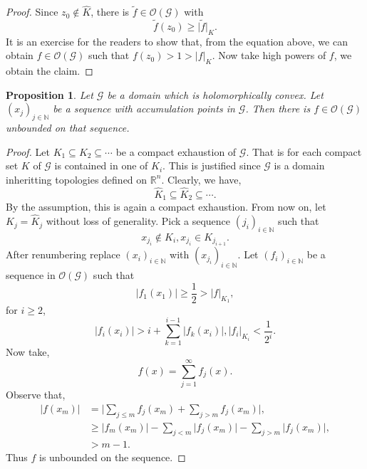 \documentclass{article}
\newtheorem{proposition}{Proposition}[section]
\newcommand{\N}[0]{\mathbb{N}}
\newcommand{\R}[0]{\mathbb{R}}
\newcommand{\G}[0]{\mathcal{G}}
\newcommand{\Ouv}[0]{\mathcal{O}}
\begin{document}
\begin{proof}
  Since $z_0\not\in\hat{K}$, there is $\tilde{f}\in\Ouv(\G)$ with 
  \begin{equation*}
    \tilde{f}(z_0)\geq\vert \tilde{f}\vert_K.
  \end{equation*}
  It is an exercise for the readers to show that, from the equation above, we can obtain $f\in\Ouv(\G)$ such that $f(z_0)>1 >\vert f\vert_K$. Now take high powers of $f$, we obtain the claim.
\end{proof}

\begin{proposition}
  \label{proposition_holomorphically_convex_unbounded_function}
  Let $\G$ be a domain which is holomorphically convex. Let $(x_j)_{j\in\N}$ be a sequence with accumulation points in $\G$. Then there is $f\in\Ouv(\G)$ unbounded on that sequence.
\end{proposition}

\begin{proof}
  Let $K_1\subseteq K_2\subseteq \cdots$ be a compact exhaustion of $\G$. That is for each compact set $K$ of $\G$ is contained in one of $K_i$. This is justified since $\G$ is a domain inheritting topologies defined on $\R^n$. Clearly, we have,
  \begin{equation*}
    \hat{K}_1\subseteq \hat{K}_2\subseteq\cdots.
  \end{equation*}
  By the assumption, this is again a compact exhaustion. From now on, let $K_j = \hat{K}_j$ without loss of generality. Pick a sequence $(j_i)_{i\in\N}$ such that 
  \begin{equation*}
    x_{j_i}\not\in K_i,x_{j_i}\in K_{j_{i+1}}.
  \end{equation*}
  After renumbering replace $(x_i)_{i\in\N}$ with $(x_{j_i})_{i\in\N}$. Let $(f_i)_{i\in\N}$ be a sequence in $\Ouv(\G)$ such that
  \begin{equation*}
    \vert f_1(x_1)\vert \geq {\frac 1 2} >\vert f\vert_{K_1},
  \end{equation*} 
  for $i\geq 2$,
  \begin{equation*}
    \vert f_i(x_i)\vert > i+\sum_{k=1}^{i-1}\vert f_{k}(x_i)\vert, \vert f_i\vert_{K_i}<{\frac 1 {2^i}}.
  \end{equation*}
  Now take,
  \begin{equation*}
    f(x) = \sum_{j=1}^\infty f_j(x).
  \end{equation*}
  Observe that,
  \begin{align*}
    \vert f(x_m)\vert &=\vert\sum_{j\leq m}f_j(x_m)+\sum_{j>m}f_j(x_m)\vert,\\
     &\geq \vert f_m(x_m)\vert - \sum_{j<m}\vert f_j(x_m)\vert -\sum_{j>m}\vert f_j(x_m)\vert,\\
     & > m-1.
  \end{align*}
  Thus $f$ is unbounded on the sequence.
\end{proof}
\end{document}
